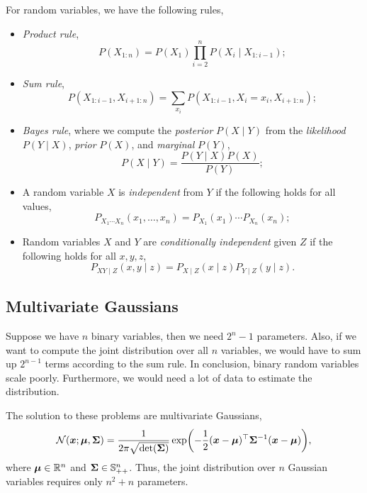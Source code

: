 For random variables, we have the following rules,
\begin{itemize}
    \item \textit{Product rule}, \[
              P(X_{1:n}) = P(X_1)\prod_{i=2}^nP(X_i\mid X_{1:i-1});
          \]
    \item \textit{Sum rule}, \[
              P(X_{1:i-1}, X_{i+1:n}) = \sum_{x_i} P(X_{1:i-1}, X_i=x_i, X_{i+1:n});
          \]
    \item \textit{Bayes rule}, where we compute the \textit{posterior} $P(X\mid
              Y)$ from the \textit{likelihood} $P(Y\mid X)$, \textit{prior} $P(X)$, and
          \textit{marginal} $P(Y)$, \[
              P(X\mid Y) = \frac{P(Y\mid X)P(X)}{P(Y)};
          \]
    \item A random variable $X$ is \textit{independent} from $Y$ if the following
          holds for all values, \[
              P_{X_1\cdots X_n}(x_1,\ldots,x_n) = P_{X_1}(x_1)\cdots P_{X_n}(x_n);
          \]
    \item Random variables $X$ and $Y$ are \textit{conditionally independent}
          given $Z$ if the following holds for all $x,y,z$, \[
              P_{XY\mid Z}(x,y\mid z) = P_{X\mid Z}(x\mid z)P_{Y\mid Z}(y\mid z).
          \]
\end{itemize}

\subsection{Multivariate Gaussians}

Suppose we have $n$ binary variables, then we need $2^n-1$
parameters. Also,
if we want to compute the joint distribution over all $n$
variables, we would have to sum up $2^{n-1}$ terms
according to the sum rule. In conclusion, binary random variables scale poorly.
Furthermore, we would need a lot of data to estimate the distribution.

The solution to these problems are multivariate Gaussians, \[
    \mathcal{N}(\vec{x};\vec{\mu},\mat{\Sigma}) =
    \frac{1}{2\pi\sqrt{\det{\mat{\Sigma}}}}\exp\lft( -\frac{1}{2}
    \transpose{(\vec{x}-\vec{\mu})}\inv{\mat{\Sigma}}(\vec{x}-\vec{\mu}) \rgt),
\]
where $\bm{\mu}\in\mathbb{R}^n$ and
$\bm{\Sigma}\in\mathbb{S}_{++}^n$. Thus, the joint distribution over $n$ Gaussian
variables requires only $n^2+n$ parameters.

